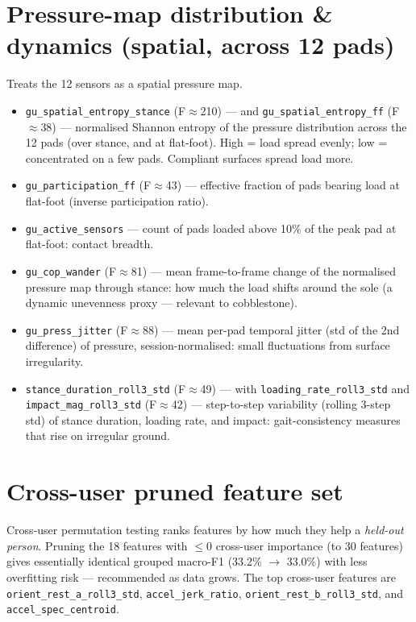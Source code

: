 \documentclass[11pt]{article}
\begin{document}
\section{Pressure-map distribution \& dynamics (spatial, across 12 pads)}
Treats the 12 sensors as a spatial pressure map.
\begin{itemize}
\item \texttt{gu\_spatial\_entropy\_stance} (F$\approx$210) --- and \texttt{gu\_spatial\_entropy\_ff} (F$\approx$38) --- normalised Shannon entropy of the pressure distribution across the 12 pads (over stance, and at flat-foot). High = load spread evenly; low = concentrated on a few pads. Compliant surfaces spread load more.
\item \texttt{gu\_participation\_ff} (F$\approx$43) --- effective fraction of pads bearing load at flat-foot (inverse participation ratio).
\item \texttt{gu\_active\_sensors} --- count of pads loaded above 10\% of the peak pad at flat-foot: contact breadth.
\item \texttt{gu\_cop\_wander} (F$\approx$81) --- mean frame-to-frame change of the normalised pressure map through stance: how much the load shifts around the sole (a dynamic unevenness proxy --- relevant to cobblestone).
\item \texttt{gu\_press\_jitter} (F$\approx$88) --- mean per-pad temporal jitter (std of the 2nd difference) of pressure, session-normalised: small fluctuations from surface irregularity.
\item \texttt{stance\_duration\_roll3\_std} (F$\approx$49) --- with \texttt{loading\_rate\_roll3\_std} and \texttt{impact\_mag\_roll3\_std} (F$\approx$42) --- step-to-step variability (rolling 3-step std) of stance duration, loading rate, and impact: gait-consistency measures that rise on irregular ground.
\end{itemize}

\section{Cross-user pruned feature set}
Cross-user permutation testing ranks features by how much they help a \emph{held-out person}.
Pruning the 18 features with $\le 0$ cross-user importance (to 30 features) gives essentially
identical grouped macro-F1 (33.2\% $\to$ 33.0\%) with less overfitting risk --- recommended as
data grows. The top cross-user features are \texttt{orient\_rest\_a\_roll3\_std}, \texttt{accel\_jerk\_ratio}, \texttt{orient\_rest\_b\_roll3\_std}, and \texttt{accel\_spec\_centroid}.
\end{document}

